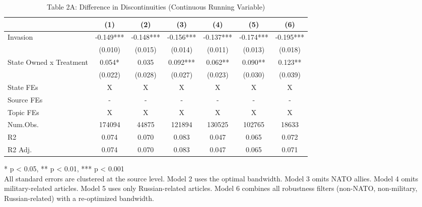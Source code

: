 \begin{table}[!t]
\caption{Table 2A: Difference in Discontinuities (Continuous Running Variable)} 
\fontsize{12.0pt}{14.4pt}\selectfont
\begin{tabular*}{\linewidth}{@{\extracolsep{\fill}}lcccccc}
\toprule
  & (1) & (2) & (3) & (4) & (5) & (6) \\ 
\midrule\addlinespace[2.5pt]
Invasion & -0.149*** & -0.148*** & -0.156*** & -0.137*** & -0.174*** & -0.195*** \\ 
 & (0.010) & (0.015) & (0.014) & (0.011) & (0.013) & (0.018) \\ 
State Owned x Treatment & 0.054* & 0.035 & 0.092*** & 0.062** & 0.090** & 0.123** \\ 
{} & {(0.022)} & {(0.028)} & {(0.027)} & {(0.023)} & {(0.030)} & {(0.039)} \\ 
State FEs & X & X & X & X & X & X \\ 
Source FEs & - & - & - & - & - & - \\ 
Topic FEs & X & X & X & X & X & X \\ 
Num.Obs. & 174094 & 44875 & 121894 & 130525 & 102765 & 18633 \\ 
R2 & 0.074 & 0.070 & 0.083 & 0.047 & 0.065 & 0.072 \\ 
R2 Adj. & 0.074 & 0.070 & 0.083 & 0.047 & 0.065 & 0.071 \\ 
\bottomrule
\end{tabular*}
\begin{minipage}{\linewidth}
* p < 0.05, ** p < 0.01, *** p < 0.001\\
All standard errors are clustered at the source level. Model 2 uses the optimal
bandwidth. Model 3 omits NATO allies. Model 4 omits military-related articles.
Model 5 uses only Russian-related articles. Model 6 combines all robustness
filters (non-NATO, non-military, Russian-related) with a re-optimized bandwidth.\\
\end{minipage}
\end{table}

